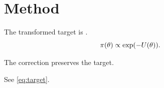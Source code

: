 \section{Method}\label{sec:method}
The transformed target is \target.
\begin{equation}\label{eq:target}
  \pi(\theta) \propto \exp(-U(\theta)).
\end{equation}
\begin{theorem}\label{thm:exact}
The correction preserves the target.
\end{theorem}
See \eqref{eq:target}.
